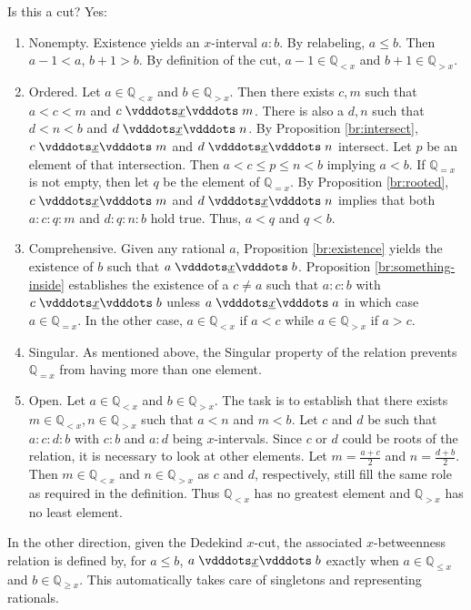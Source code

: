 \documentclass{rmj-public}
\newcommand{\qcut}[2][x]{\ensuremath{\mathbb{Q}_{#2 #1}}}
\newcommand{\qlt}[1][x]{\qcut[#1]{<}}
\newcommand{\qeq}[1][x]{\qcut[#1]{=}}
\newcommand{\qgt}[1][x]{\qcut[#1]{>}}
\newcommand{\qgeq}[1][x]{\qcut[#1]{\geq}}
\newcommand{\qleq}[1][x]{\qcut[#1]{\leq}}
\begin{document}
Is this a cut? Yes: 
\begin{enumerate}
    \item Nonempty. Existence yields an $x$-interval $a:b$. By relabeling, $a \leq b$. Then $a-1< a$, $b+1 > b$. By definition of the cut, $a-1 \in \qlt$ and $b+1 \in \qgt$.
    \item Ordered. Let $a \in \qlt$ and $b \in \qgt$.  Then there exists $c, m$ such that $a < c < m$ and $c \xrel m$. There is also a $d, n$ such that $d < n< b$  and $d \xrel n$. By Proposition \ref{br:intersect}, $c \xrel m$ and $d \xrel n$ intersect. Let $p$ be an element of that intersection. Then $a < c \leq p \leq n < b$ implying $a < b$.  If $\qeq$ is not empty, then let $q$ be the element of $\qeq$. By Proposition \ref{br:rooted}, $c \xrel m$ and $d \xrel n$ implies that both $a:c:q:m$ and $d:q:n:b$ hold true. Thus, $a < q$ and $q < b$.  
    \item Comprehensive. Given any rational $a$, Proposition \ref{br:existence} yields the existence of $b$ such that $a \xrel b$. Proposition \ref{br:something-inside} establishes the existence of a $c \neq a$ such that $a:c:b$ with $c \xrel b$ unless $a \xrel a$ in which case $a \in \qeq$. In the other case, $a \in \qlt$ if $a < c$ while $a  \in \qgt$ if $a > c$. 
    \item Singular. As mentioned above, the Singular property of the relation prevents $\qeq$ from having more than one element. 
    \item Open. Let $a\in \qlt$ and $b \in \qgt$. The task is to establish that there exists $m \in \qlt, n \in \qgt$ such that $a < n$ and $m < b$. Let $c$ and $d$ be such that $a:c:d:b$ with $c:b$ and $a:d$ being $x$-intervals. Since $c$ or $d$ could be roots of the relation, it is necessary to look at other elements. Let $m = \frac{a+c}{2}$ and $n = \frac{d+b}{2}$. Then $m \in \qlt$ and $n \in \qgt$ as $c$ and $d$, respectively, still fill the same role as required in the definition. Thus $\qlt$ has no greatest element and $\qgt$ has no least element. 
\end{enumerate}

In the other direction, given the Dedekind $x$-cut, the associated $x$-betweenness relation is defined by, for $a \leq b$, $a \xrel b$ exactly when $a \in \qleq$ and $b \in \qgeq$. This automatically takes care of singletons and representing rationals. 
\end{document}
